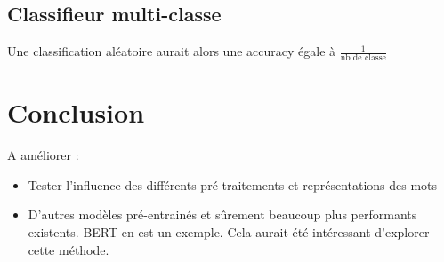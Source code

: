 \documentclass[a4paper,11pt]{article}
\begin{document}
\subsection{Classifieur multi-classe}
Une classification aléatoire aurait alors une accuracy égale à $\frac{1}{\text{nb de classe}}$




\section*{Conclusion}
A améliorer :

\begin{itemize}
    \item Tester l'influence des différents pré-traitements et représentations des mots
    \item D'autres modèles pré-entrainés et sûrement beaucoup plus performants existents. BERT en est un exemple. Cela aurait été intéressant d'explorer cette méthode.

\end{itemize}
\end{document}

